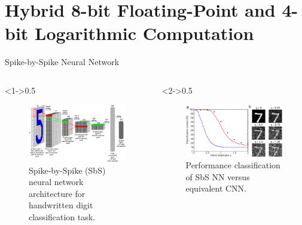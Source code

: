 \section{Hybrid 8-bit Floating-Point and 4-bit Logarithmic Computation}
\tableofcontents[currentsection]
\begin{frame}{Spike-by-Spike Neural Network}
	\begin{columns}[c] %
		
		\begin{column}<1->{0.5\textwidth}
			\begin{figure}
				\includegraphics[width=\textwidth]{../chapters/sbs_accelerator/figures/sbs_network.pdf} %
				\caption{\scriptsize Spike-by-Spike (SbS) neural network architecture for handwritten digit classification task.}
			\end{figure}
		\end{column}
		
		\begin{column}<2->{0.5\textwidth}
			\begin{figure}
				\includegraphics[width=\textwidth]{../chapters/sbs_accelerator/figures/sbs_robustnes.pdf} %
				\caption{\scriptsize Performance classification of SbS NN versus equivalent CNN.}
			\end{figure}
		\end{column}
		
	\end{columns}
\end{frame}


